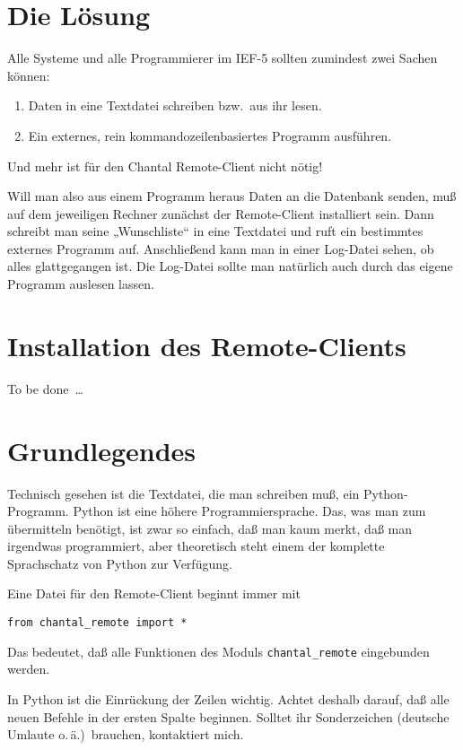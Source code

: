 \documentclass[german,11pt]{article}
\newcommand{\IEF}{\mbox{IEF-5}\xspace}
\begin{document}
\section{Die Lösung}

Alle Systeme und alle Programmierer im \IEF sollten zumindest zwei Sachen
können:
\begin{enumerate}
\item Daten in eine Textdatei schreiben bzw.\ aus ihr lesen.
\item Ein externes, rein kommandozeilenbasiertes Programm ausführen.
\end{enumerate}
Und mehr ist für den Chantal Remote-Client nicht nötig!

Will man also aus einem Programm heraus Daten an die Datenbank senden, muß auf
dem jeweiligen Rechner zunächst der Remote-Client installiert sein.  Dann
schreibt man seine „Wunschliste“ in eine Textdatei und ruft ein bestimmtes
externes Programm auf.  Anschließend kann man in einer Log-Datei sehen, ob
alles glattgegangen ist.  Die Log-Datei sollte man natürlich auch durch das
eigene Programm auslesen lassen.

\section{Installation des Remote-Clients}

To be done~…

\section{Grundlegendes}

Technisch gesehen ist die Textdatei, die man schreiben muß, ein
Python-Programm.  Python ist eine höhere Programmiersprache.  Das, was man zum
übermitteln benötigt, ist zwar so einfach, daß man kaum merkt, daß man
irgendwas programmiert, aber theoretisch steht einem der komplette Sprachschatz
von Python zur Verfügung.

Eine Datei für den Remote-Client beginnt immer mit
\begin{lstlisting}
from chantal_remote import *
\end{lstlisting}
Das bedeutet, daß alle Funktionen des Moduls \lstinline{chantal_remote}
eingebunden werden.

In Python ist die Einrückung der Zeilen wichtig.  Achtet deshalb darauf, daß
alle neuen Befehle in der ersten Spalte beginnen.  Solltet ihr Sonderzeichen
(deutsche Umlaute o.\,ä.)\ brauchen, kontaktiert mich.
\end{document}
